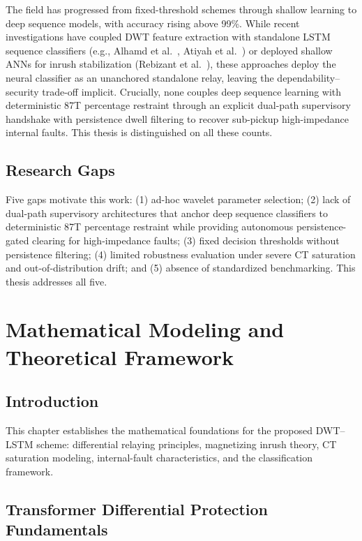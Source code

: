 \documentclass[12pt,a4paper,oneside]{report}
\begin{document}
The field has progressed from fixed-threshold schemes through shallow learning to deep sequence models, with accuracy rising above 99\%. While recent investigations have coupled DWT feature extraction with standalone LSTM sequence classifiers (e.g., Alhamd et al.~\cite{ref1}, Atiyah et al.~\cite{ref3}) or deployed shallow ANNs for inrush stabilization (Rebizant et al.~\cite{ref15}), these approaches deploy the neural classifier as an unanchored standalone relay, leaving the dependability--security trade-off implicit. Crucially, none couples deep sequence learning with deterministic 87T percentage restraint through an explicit dual-path supervisory handshake with persistence dwell filtering to recover sub-pickup high-impedance internal faults. This thesis is distinguished on all these counts.

\section{Research Gaps}
Five gaps motivate this work: (1) ad-hoc wavelet parameter selection; (2) lack of dual-path supervisory architectures that anchor deep sequence classifiers to deterministic 87T percentage restraint while providing autonomous persistence-gated clearing for high-impedance faults; (3) fixed decision thresholds without persistence filtering; (4) limited robustness evaluation under severe CT saturation and out-of-distribution drift; and (5) absence of standardized benchmarking. This thesis addresses all five.

\chapter{Mathematical Modeling and Theoretical Framework}
\section{Introduction}
This chapter establishes the mathematical foundations for the proposed DWT--LSTM scheme: differential relaying principles, magnetizing inrush theory, CT saturation modeling, internal-fault characteristics, and the classification framework.

\section{Transformer Differential Protection Fundamentals}
\end{document}
